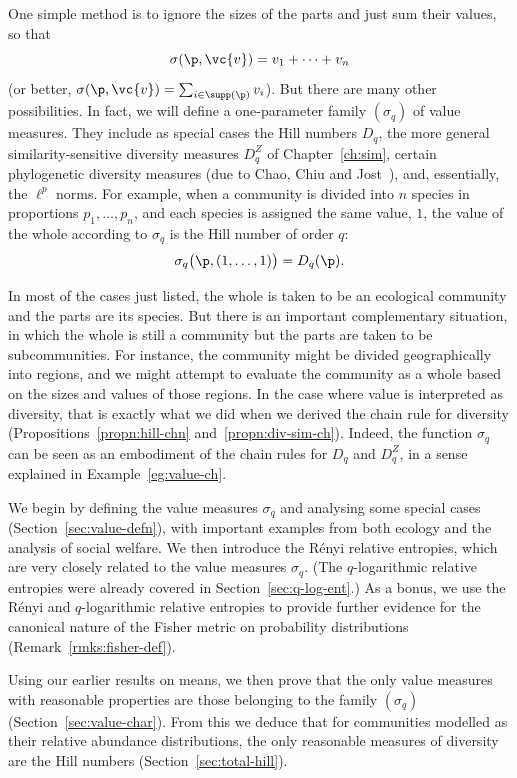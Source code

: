 One simple method is to ignore the sizes of the parts and just sum their
values, so that
\[
\sigma(\p, \vc{v}) = v_1 + \cdots + v_n
\]
(or better, $\sigma(\p, \vc{v}) = \sum_{i \in \supp(\p)} v_i$).  But there
are many other possibilities.  In fact, we will define a one-parameter
family $(\sigma_q)$ of value measures.  They include as special cases the
Hill numbers $D_q$, the more general similarity-sensitive diversity
measures $D_q^Z$ of Chapter~\ref{ch:sim}, certain phylogenetic diversity
measures (due to Chao, Chiu and Jost~\cite{CCJ}), and, essentially, the
$\ell^p$ norms.  For example, when a community is
divided into $n$ species in proportions $p_1, \ldots, p_n$, and each
species is assigned the same value, $1$, the value of the whole according
to $\sigma_q$ is the Hill number of order $q$:
\[
\sigma_q\bigl(\p, (1, \ldots, 1)\bigr) = D_q(\p).
\]

In most of the cases just listed, the whole is taken to be an ecological
community and the parts are its species.  But there is an important
complementary situation, in which the whole is still a community but the
parts are taken to be subcommunities.  For instance, the community
might be divided geographically into regions, and we might attempt to
evaluate the community as a whole based on the sizes and values of those
regions.  In the case where value is interpreted as diversity, that is
exactly what we did when we derived the chain rule for diversity
(Propositions~\ref{propn:hill-chn} and~\ref{propn:div-sim-ch}).  Indeed,
the function $\sigma_q$ can be seen as an embodiment of the chain rules for
$D_q$ and $D_q^Z$, in a sense explained in Example~\ref{eg:value-ch}.

We begin by defining the value measures $\sigma_q$ and analysing some
special cases (Section~\ref{sec:value-defn}), with important examples from
both ecology and the analysis of social welfare.  We then introduce the
R\'enyi relative entropies, which are very closely related to the value
measures $\sigma_q$.  (The $q$-logarithmic relative entropies were already
covered in Section~\ref{sec:q-log-ent}.)  As a bonus, we use the R\'enyi
and $q$-logarithmic relative entropies to provide further evidence for the
canonical nature of the Fisher metric on probability distributions
(Remark~\ref{rmks:fisher-def}).

Using our earlier results on means, we then prove that the only value
measures with reasonable properties are those belonging to the family
$(\sigma_q)$ (Section~\ref{sec:value-char}).  From this we deduce that for
communities modelled as their relative abundance distributions,
the only reasonable measures of diversity are the Hill numbers
(Section~\ref{sec:total-hill}).

